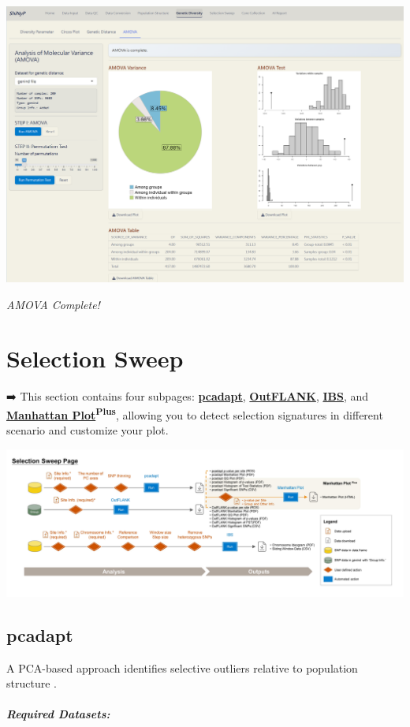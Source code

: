 \documentclass[
]{book}
\begin{document}
\includegraphics{images/clipboard-1689228022.png}

\emph{AMOVA Complete!}

\chapter{Selection Sweep}\label{sec-selection-sweep}

➡️ This section contains four subpages: \ul{\textbf{pcadapt}}, \ul{\textbf{OutFLANK}}, \ul{\textbf{IBS}}, and \ul{\textbf{Manhattan Plot}}\textsuperscript{\textbf{Plus}}, allowing you to detect selection signatures in different scenario and customize your plot.

\includegraphics{images/Supp. Fig. 1-5_頁面_4.jpg}

\section{pcadapt}\label{pcadapt}

A PCA-based approach identifies selective outliers relative to population structure \citep{Luu2017}.

\paragraph*{Required Datasets:}\label{required-datasets-1}
\end{document}
